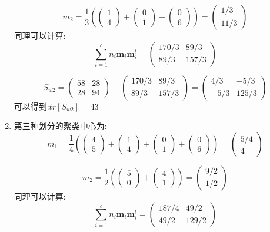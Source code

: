 \documentclass[homework]{IEEEtran}
\begin{document}
\begin{CJK}{UTF8}{gkai}
\begin{enumerate}
$$
m_2 = \frac{1}{3} \left(
\begin{pmatrix}1 \\ 4\end{pmatrix}+\begin{pmatrix}0 \\ 1\end{pmatrix}+\begin{pmatrix}0 \\ 6\end{pmatrix} \right)
= \begin{pmatrix}1/3 \\ 11/3\end{pmatrix}
$$
同理可以计算:
$$
\sum_{i=1}^{c} n_{i} \mathbf{m}_{i} \mathbf{m}_{i}^{t} = 
\begin{pmatrix}170/3 & 89/3\\ 89/3 & 157/3
\end{pmatrix}
$$

$$
S_{w2} = \begin{pmatrix}58 & 28 \\28 & 94\end{pmatrix}-\begin{pmatrix}170/3 & 89/3\\ 89/3 & 157/3\end{pmatrix}
=\begin{pmatrix}4/3 & -5/3\\ -5/3 & 125/3\end{pmatrix}
$$
可以得到:$tr\left[S_{w2} \right] = 43$
\item 第三种划分的聚类中心为:
$$
 m_1 = \frac{1}{4} \left(
\begin{pmatrix}4 \\ 5\end{pmatrix}+\begin{pmatrix}1 \\ 4\end{pmatrix}+\begin{pmatrix}0 \\ 1\end{pmatrix}+\begin{pmatrix}0 \\ 6
\end{pmatrix} \right)
= \begin{pmatrix}5/4 \\ 4\end{pmatrix}
$$

$$
m_2 = \frac{1}{2} \left(
\begin{pmatrix}5 \\ 0\end{pmatrix}+\begin{pmatrix}4 \\ 1\end{pmatrix} \right)
= \begin{pmatrix}9/2 \\ 1/2\end{pmatrix}
$$
同理可以计算:
$$
\sum_{i=1}^{c} n_{i} \mathbf{m}_{i} \mathbf{m}_{i}^{t} = \begin{pmatrix}187/4 & 49/2\\ 49/2 & 129/2\end{pmatrix}
$$


\end{enumerate}
\end{CJK}
\end{document}

